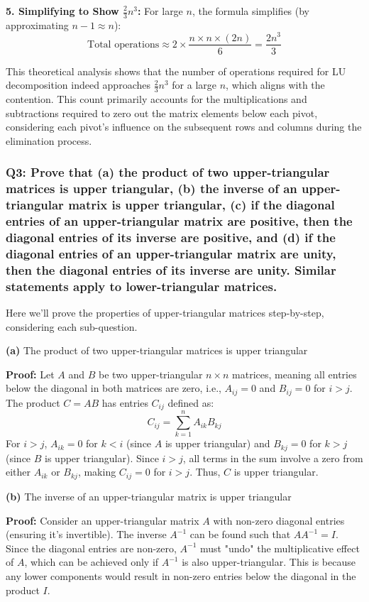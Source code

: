 \documentclass[8pt]{article}
\begin{document}
\textbf{5. Simplifying to Show \(\frac{2}{3} n^3\):}
   For large \(n\), the formula simplifies (by approximating \(n-1 \approx n\)):
   \[
   \text{Total operations} \approx 2 \times \frac{n \times n \times (2n)}{6} = \frac{2n^3}{3}
   \]

This theoretical analysis shows that the number of operations required for LU decomposition indeed approaches \(\frac{2}{3} n^3\) for a large \(n\), which aligns with the contention. This count primarily accounts for the multiplications and subtractions required to zero out the matrix elements below each pivot, considering each pivot's influence on the subsequent rows and columns during the elimination process.

\subsubsection*{Q3: Prove that (a) the product of two upper-triangular matrices is upper triangular, (b) the inverse of an upper-triangular matrix is upper triangular, (c) if the diagonal entries of an upper-triangular matrix are positive, then the diagonal entries of its inverse are positive, and (d) if the diagonal entries of an upper-triangular matrix are unity, then the diagonal entries of its inverse are unity. Similar statements apply to lower-triangular matrices.}

Here we'll prove the properties of upper-triangular matrices step-by-step, considering each sub-question.

\textbf{(a)} The product of two upper-triangular matrices is upper triangular

\textbf{Proof:}
Let \( A \) and \( B \) be two upper-triangular \( n \times n \) matrices, meaning all entries below the diagonal in both matrices are zero, i.e., \( A_{ij} = 0 \) and \( B_{ij} = 0 \) for \( i > j \). The product \( C = AB \) has entries \( C_{ij} \) defined as:
\[ C_{ij} = \sum_{k=1}^n A_{ik}B_{kj} \]
For \( i > j \), \( A_{ik} = 0 \) for \( k < i \) (since \( A \) is upper triangular) and \( B_{kj} = 0 \) for \( k > j \) (since \( B \) is upper triangular). Since \( i > j \), all terms in the sum involve a zero from either \( A_{ik} \) or \( B_{kj} \), making \( C_{ij} = 0 \) for \( i > j \). Thus, \( C \) is upper triangular.

\textbf{(b)} The inverse of an upper-triangular matrix is upper triangular

\textbf{Proof:}
Consider an upper-triangular matrix \( A \) with non-zero diagonal entries (ensuring it's invertible). The inverse \( A^{-1} \) can be found such that \( AA^{-1} = I \). Since the diagonal entries are non-zero, \( A^{-1} \) must "undo" the multiplicative effect of \( A \), which can be achieved only if \( A^{-1} \) is also upper-triangular. This is because any lower components would result in non-zero entries below the diagonal in the product \( I \).
\end{document}
